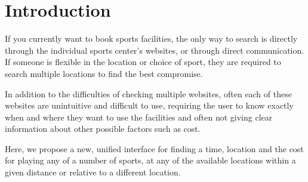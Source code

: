 \section{Introduction}
\label{sec:introduction}

If you currently want to book sports facilities, the only way to search
is directly through the individual sports center's websites, or through
direct communication. If someone is flexible in the location or choice
of sport, they are required to search multiple locations to find the
best compromise.

In addition to the difficulties of checking multiple websites, often
each of these websites are unintuitive and difficult to use, requiring
the user to know exactly when and where they want to use the facilities
and often not giving clear information about other possible factors
such as cost.

Here, we propose a new, unified interface for finding a time, location
and the cost for playing any of a number of sports, at any of the
available locations within a given distance or relative to a different
location.
